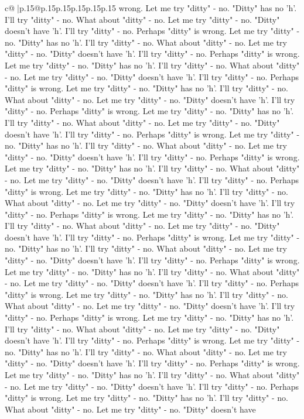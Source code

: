 \documentclass{article}
\begin{document}
{\begin{supertabular}{c@{$\;$}|p{.15\linewidth}@{}p{.15\linewidth}p{.15\linewidth}p{.15\linewidth}p{.15\linewidth}p{.15\linewidth}}
{{{wrong. Let me try "ditty" {-} no. "Ditty" has no 'h'. I'll try "ditty" {-} no. What about "ditty" {-} no. Let me try "ditty" {-} no. "Ditty" doesn't have 'h'. I'll try "ditty" {-} no. Perhaps "ditty" is wrong. Let me try "ditty" {-} no. "Ditty" has no 'h'. I'll try "ditty" {-} no. What about "ditty" {-} no. Let me try "ditty" {-} no. "Ditty" doesn't have 'h'. I'll try "ditty" {-} no. Perhaps "ditty" is wrong. Let me try "ditty" {-} no. "Ditty" has no 'h'. I'll try "ditty" {-} no. What about "ditty" {-} no. Let me try "ditty" {-} no. "Ditty" doesn't have 'h'. I'll try "ditty" {-} no. Perhaps "ditty" is wrong. Let me try "ditty" {-} no. "Ditty" has no 'h'. I'll try "ditty" {-} no. What about "ditty" {-} no. Let me try "ditty" {-} no. "Ditty" doesn't have 'h'. I'll try "ditty" {-} no. Perhaps "ditty" is wrong. Let me try "ditty" {-} no. "Ditty" has no 'h'. I'll try "ditty" {-} no. What about "ditty" {-} no. Let me try "ditty" {-} no. "Ditty" doesn't have 'h'. I'll try "ditty" {-} no. Perhaps "ditty" is wrong. Let me try "ditty" {-} no. "Ditty" has no 'h'. I'll try "ditty" {-} no. What about "ditty" {-} no. Let me try "ditty" {-} no. "Ditty" doesn't have 'h'. I'll try "ditty" {-} no. Perhaps "ditty" is wrong. Let me try "ditty" {-} no. "Ditty" has no 'h'. I'll try "ditty" {-} no. What about "ditty" {-} no. Let me try "ditty" {-} no. "Ditty" doesn't have 'h'. I'll try "ditty" {-} no. Perhaps "ditty" is wrong. Let me try "ditty" {-} no. "Ditty" has no 'h'. I'll try "ditty" {-} no. What about "ditty" {-} no. Let me try "ditty" {-} no. "Ditty" doesn't have 'h'. I'll try "ditty" {-} no. Perhaps "ditty" is wrong. Let me try "ditty" {-} no. "Ditty" has no 'h'. I'll try "ditty" {-} no. What about "ditty" {-} no. Let me try "ditty" {-} no. "Ditty" doesn't have 'h'. I'll try "ditty" {-} no. Perhaps "ditty" is wrong. Let me try "ditty" {-} no. "Ditty" has no 'h'. I'll try "ditty" {-} no. What about "ditty" {-} no. Let me try "ditty" {-} no. "Ditty" doesn't have 'h'. I'll try "ditty" {-} no. Perhaps "ditty" is wrong. Let me try "ditty" {-} no. "Ditty" has no 'h'. I'll try "ditty" {-} no. What about "ditty" {-} no. Let me try "ditty" {-} no. "Ditty" doesn't have 'h'. I'll try "ditty" {-} no. Perhaps "ditty" is wrong. Let me try "ditty" {-} no. "Ditty" has no 'h'. I'll try "ditty" {-} no. What about "ditty" {-} no. Let me try "ditty" {-} no. "Ditty" doesn't have 'h'. I'll try "ditty" {-} no. Perhaps "ditty" is wrong. Let me try "ditty" {-} no. "Ditty" has no 'h'. I'll try "ditty" {-} no. What about "ditty" {-} no. Let me try "ditty" {-} no. "Ditty" doesn't have 'h'. I'll try "ditty" {-} no. Perhaps "ditty" is wrong. Let me try "ditty" {-} no. "Ditty" has no 'h'. I'll try "ditty" {-} no. What about "ditty" {-} no. Let me try "ditty" {-} no. "Ditty" doesn't have 'h'. I'll try "ditty" {-} no. Perhaps "ditty" is wrong. Let me try "ditty" {-} no. "Ditty" has no 'h'. I'll try "ditty" {-} no. What about "ditty" {-} no. Let me try "ditty" {-} no. "Ditty" doesn't have 'h'. I'll try "ditty" {-} no. Perhaps "ditty" is wrong. Let me try "ditty" {-} no. "Ditty" has no 'h'. I'll try "ditty" {-} no. What about "ditty" {-} no. Let me try "ditty" {-} no. "Ditty" doesn't have }}}
\end{supertabular}}
\end{document}
